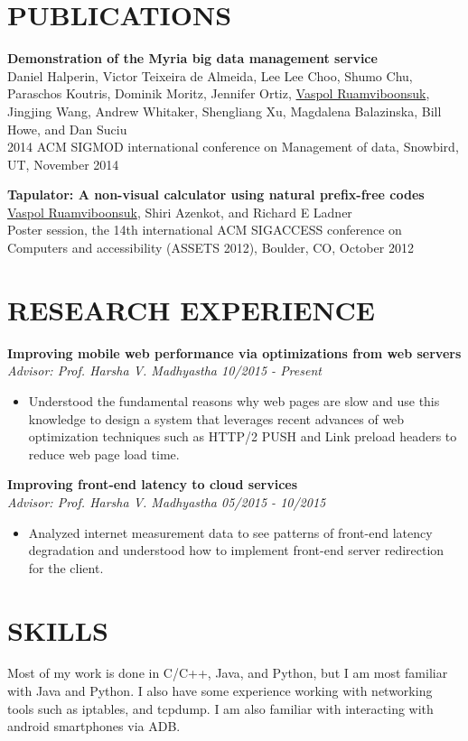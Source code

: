 \documentclass[zhemargin]{res}
\begin{document}
\begin{resume}
\section{\small PUBLICATIONS}
    \textbf{Demonstration of the Myria big data management service}\\
    Daniel Halperin, Victor Teixeira de Almeida, Lee Lee Choo, Shumo Chu, Paraschos Koutris, 
    Dominik Moritz, Jennifer Ortiz, \underline{Vaspol Ruamviboonsuk}, Jingjing Wang, 
    Andrew Whitaker, Shengliang Xu, Magdalena Balazinska, Bill Howe, and Dan Suciu\\
    2014 ACM SIGMOD international conference on Management of data, Snowbird, UT, November 2014

    \textbf{Tapulator: A non-visual calculator using natural prefix-free codes}\\
    \underline{Vaspol Ruamviboonsuk}, Shiri Azenkot, and Richard E Ladner\\
    Poster session, the 14th international ACM SIGACCESS conference on Computers and accessibility (ASSETS 2012), Boulder, CO, October 2012

\section{\small RESEARCH EXPERIENCE}
	\textbf{Improving mobile web performance via optimizations from web servers}\\
    \textit{Advisor: Prof. Harsha V. Madhyastha \hfill 10/2015 - Present}
	\begin{itemize}
    \item Understood the fundamental reasons why web pages are slow and use this 
      knowledge to design a system that leverages recent advances of web optimization 
      techniques such as HTTP/2 PUSH and Link preload headers to reduce 
      web page load time.
	\end{itemize}

	\textbf{Improving front-end latency to cloud services}\\
    \textit{Advisor: Prof. Harsha V. Madhyastha \hfill 05/2015 - 10/2015}
	\begin{itemize}
    \item Analyzed internet measurement data to see patterns of front-end latency 
      degradation and understood how to implement front-end server redirection for the client.
	\end{itemize}

\section{\small SKILLS}
	Most of my work is done in C/C++, Java, and Python, but I am most familiar 
  with Java and Python. I also have some experience working with networking 
  tools such as iptables, and tcpdump. I am also familiar with interacting 
  with android smartphones via ADB.


\end{resume}
\end{document}
